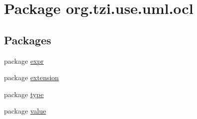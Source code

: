 \hypertarget{namespaceorg_1_1tzi_1_1use_1_1uml_1_1ocl}{\section{Package org.\-tzi.\-use.\-uml.\-ocl}
\label{namespaceorg_1_1tzi_1_1use_1_1uml_1_1ocl}
}
\subsection*{Packages}
\begin{DoxyCompactItemize}
\item 
package \hyperlink{namespaceorg_1_1tzi_1_1use_1_1uml_1_1ocl_1_1expr}{expr}
\item 
package \hyperlink{namespaceorg_1_1tzi_1_1use_1_1uml_1_1ocl_1_1extension}{extension}
\item 
package \hyperlink{namespaceorg_1_1tzi_1_1use_1_1uml_1_1ocl_1_1type}{type}
\item 
package \hyperlink{namespaceorg_1_1tzi_1_1use_1_1uml_1_1ocl_1_1value}{value}
\end{DoxyCompactItemize}
